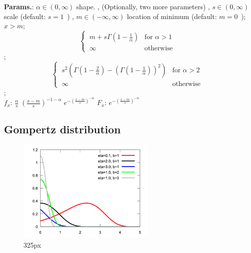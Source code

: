     {\color{darkblue} \textbf{Params.}:} {$\alpha \in (0,\infty) $ shape. ,  (Optionally, two more parameters) ,  $ s \in (0,\infty) $ scale (default: $ s=1 \, $ ) ,  $  m \in (-\infty,\infty) $ location of minimum (default: $ m=0 \, $ )}; {$x>m$}; {$$\begin{cases}
                  \ m+s\Gamma\left(1-\frac{1}{\alpha}\right)  & \text{for } \alpha>1  \\
                  \ \infty              & \text{otherwise}
                \end{cases}$$}; {$$\begin{cases}
                  \ s^2\left(\Gamma\left(1-\frac{2}{\alpha}\right)- \left(\Gamma\left(1-\frac{1}{\alpha}\right)\right)^2\right)  & \text{for } \alpha>2  \\
                  \ \infty              & \text{otherwise}
                \end{cases}$$};\hspace{0.5cm}\\{\color{darkblue} \textbf{$f_x$}:} {$\frac{\alpha}{s} \; \left(\frac{x-m}{s}\right)^{-1-\alpha} \; e^{-(\frac{x-m}{s})^{-\alpha}}$}{\color{darkblue} \textbf{$F_x$}:} {$e^{-(\frac{x-m}{s})^{-\alpha}}$}



    
        
\subsection{Gompertz distribution}


    \begin{figure}[H]
        \centering
        \includegraphics[width=0.6\textwidth]{images/GompertzPDF.png}
        \caption{325px}
    \end{figure}




